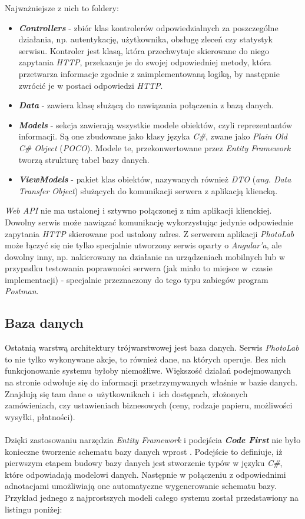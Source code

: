 Najważniejsze z nich to foldery:
\begin{itemize}
    \item \textit{\textbf{Controllers}} - zbiór klas kontrolerów odpowiedzialnych za poszczególne działania, np. autentykację, użytkownika, obsługę zleceń czy statystyk serwisu. Kontroler jest klasą, która przechwytuje skierowane do niego zapytania \textit{HTTP}, przekazuje je do swojej odpowiedniej metody, która przetwarza informacje zgodnie z zaimplementowaną logiką, by następnie zwrócić je w postaci odpowiedzi \textit{HTTP}.
    \item \textit{\textbf{Data}} - zawiera klasę służącą do nawiązania połączenia z bazą danych.
    \item \textbf{\textit{Models}} - sekcja zawierają wszystkie modele obiektów, czyli reprezentantów informacji. Są one zbudowane jako klasy języka \textit{C\#}, zwane jako \textit{Plain Old C\# Object} (\textit{POCO}). Modele te, przekonwertowane przez \textit{Entity Framework} tworzą strukturę tabel bazy danych.
    \item \textbf{\textit{ViewModels}} - pakiet klas obiektów, nazywanych również \textit{DTO} (\textit{ang. Data Transfer Object}) służących do komunikacji serwera z aplikacją kliencką.
\end{itemize}

\noindent \textit{Web API} nie ma ustalonej i sztywno połączonej z nim aplikacji klienckiej. Dowolny serwis może nawiązać komunikację wykorzystując jedynie odpowiednie zapytania \textit{HTTP} skierowane pod ustalony adres. Z serwerem aplikacji \textit{PhotoLab} może łączyć się nie tylko specjalnie utworzony serwis oparty o \textit{Angular'a}, ale dowolny inny, np. nakierowany na działanie na urządzeniach mobilnych lub w przypadku testowania poprawności serwera (jak miało to miejsce w~czasie implementacji) - specjalnie przeznaczony do tego typu zabiegów program \textit{Postman}. 



\subsection{Baza danych}
\quad Ostatnią warstwą architektury trójwarstwowej jest baza danych. Serwis \textit{PhotoLab} to nie tylko wykonywane akcje, to również dane, na których operuje. Bez nich funkcjonowanie systemu byłoby niemożliwe. Większość działań podejmowanych na stronie odwołuje się do informacji przetrzymywanych właśnie w bazie danych. Znajdują się tam dane o~użytkownikach i~ich dostępach, złożonych zamówieniach, czy ustawieniach biznesowych (ceny, rodzaje papieru, możliwości wysyłki, płatności).\\
\\
Dzięki zastosowaniu narzędzia \textit{Entity Framework} i podejścia \textit{\textbf{Code First}} nie było konieczne tworzenie schematu bazy danych wprost \cite{entity-programming}. Podejście to definiuje, iż pierwszym etapem budowy bazy danych jest stworzenie typów w języku \textit{C\#}, które odpowiadają modelowi danych. Następnie w połączeniu z odpowiednimi adnotacjami umożliwiają one automatyczne wygenerowanie schematu bazy. Przykład jednego z najprostszych modeli całego systemu został przedstawiony na listingu poniżej:
\newpage

